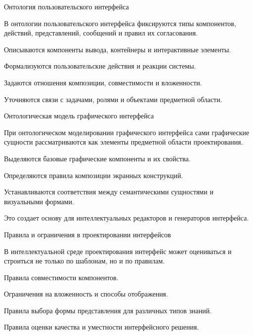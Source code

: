 \begin{frame}{Онтология пользовательского интерфейса}
	\topline
	\justifying

	В онтологии пользовательского интерфейса фиксируются типы компонентов, действий, представлений, сообщений и правил их согласования.
	
	\begin{textitemize}
		\item Описываются компоненты вывода, контейнеры и интерактивные элементы.
		\item Формализуются пользовательские действия и реакции системы.
		\item Задаются отношения композиции, совместимости и вложенности.
		\item Уточняются связи с задачами, ролями и объектами предметной области.
	\end{textitemize}
\end{frame}

\begin{frame}{Онтологическая модель графического интерфейса}
	\topline
	\justifying

	При онтологическом моделировании графического интерфейса сами графические сущности рассматриваются как элементы предметной области проектирования.
	
	\begin{textitemize}
		\item Выделяются базовые графические компоненты и их свойства.
		\item Определяются правила композиции экранных конструкций.
		\item Устанавливаются соответствия между семантическими сущностями и визуальными формами.
		\item Это создает основу для интеллектуальных редакторов и генераторов интерфейса.
	\end{textitemize}
\end{frame}

\begin{frame}{Правила и ограничения в проектировании интерфейсов}
	\topline
	\justifying

	В интеллектуальной среде проектирования интерфейс может оцениваться и строиться не только по шаблонам, но и по правилам.
	
	\begin{textitemize}
		\item Правила совместимости компонентов.
		\item Ограничения на вложенность и способы отображения.
		\item Правила выбора формы представления для различных типов знаний.
		\item Правила оценки качества и уместности интерфейсного решения.
	\end{textitemize}
\end{frame}

